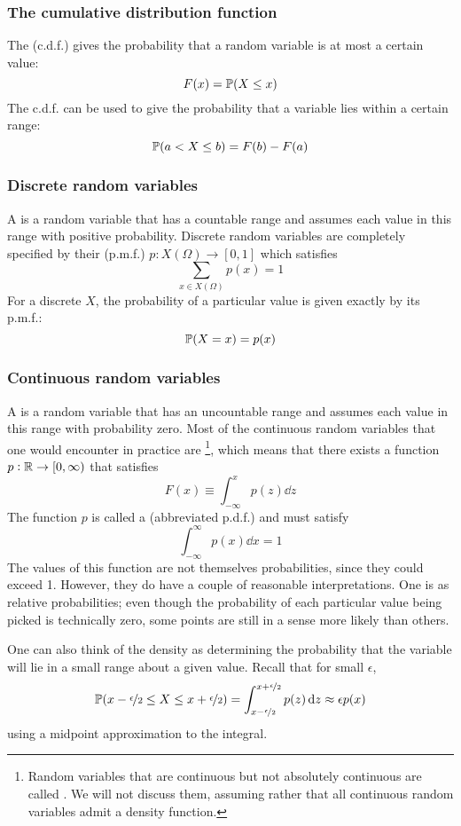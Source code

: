 \subsubsection{The cumulative distribution function}
The  (c.d.f.) gives the probability that a random variable is at most a certain value:
\[F(x) = \mathbb{P}(X \leq x)\]
The c.d.f. can be used to give the probability that a variable lies within a certain range:
\[\mathbb{P}(a < X \leq b) = F(b) - F(a)\]

\subsubsection{Discrete random variables}
A  is a random variable that has a countable range and assumes each value in this range with positive probability.
Discrete random variables are completely specified by their  (p.m.f.) $p : X(\Omega) \to [0,1]$ which satisfies
\[\sum_{x \in X(\Omega)} p(x) = 1\]
For a discrete $X$, the probability of a particular value is given exactly by its p.m.f.:
\[\mathbb{P}(X = x) = p(x)\]

\subsubsection{Continuous random variables}
A  is a random variable that has an uncountable range and assumes each value in this range with probability zero.
Most of the continuous random variables that one would encounter in practice are \footnote{
    Random variables that are continuous but not absolutely continuous are called .
    We will not discuss them, assuming rather that all continuous random variables admit a density function.
}, which means that there exists a function $p : \mathbb{R} \to [0,\infty)$ that satisfies
\[F(x) \equiv \int_{-\infty}^x p(z)\dd{z}\]
The function $p$ is called a  (abbreviated p.d.f.) and must satisfy
\[\int_{-\infty}^\infty p(x)\dd{x} = 1\]
The values of this function are not themselves probabilities, since they could exceed 1.
However, they do have a couple of reasonable interpretations.
One is as relative probabilities; even though the probability of each particular value being picked is technically zero, some points are still in a sense more likely than others.

One can also think of the density as determining the probability that the variable will lie in a small range about a given value.
Recall that for small $\epsilon$,
\[\mathbb{P}(x-\nicefrac{\epsilon}{2} \leq X \leq x+\nicefrac{\epsilon}{2}) = \int_{x-\nicefrac{\epsilon}{2}}^{x+\nicefrac{\epsilon}{2}} p(z)\dd{z} \approx \epsilon p(x)\]
using a midpoint approximation to the integral.


